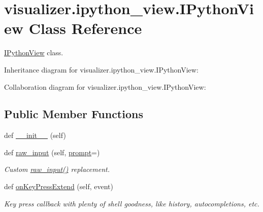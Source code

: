 \hypertarget{classvisualizer_1_1ipython__view_1_1IPythonView}{}\section{visualizer.\+ipython\+\_\+view.\+I\+Python\+View Class Reference}
\label{classvisualizer_1_1ipython__view_1_1IPythonView}


\hyperlink{classvisualizer_1_1ipython__view_1_1IPythonView}{I\+Python\+View} class.  




Inheritance diagram for visualizer.\+ipython\+\_\+view.\+I\+Python\+View\+:


Collaboration diagram for visualizer.\+ipython\+\_\+view.\+I\+Python\+View\+:
\subsection*{Public Member Functions}
\begin{DoxyCompactItemize}
\item 
def \hyperlink{classvisualizer_1_1ipython__view_1_1IPythonView_affe31c9ab99b05c0479701ccac7ec70a}{\+\_\+\+\_\+init\+\_\+\+\_\+} (self)
\item 
def \hyperlink{classvisualizer_1_1ipython__view_1_1IPythonView_a2d725299a1a2ba91356404a914c63f43}{raw\+\_\+input} (self, \hyperlink{classvisualizer_1_1ipython__view_1_1IPythonView_ac70be49befad3abf7fbb1fa8d460e439}{prompt}=\textquotesingle{}\textquotesingle{})
\begin{DoxyCompactList}\small\item\em Custom \hyperlink{classvisualizer_1_1ipython__view_1_1IPythonView_a2d725299a1a2ba91356404a914c63f43}{raw\+\_\+input()} replacement. \end{DoxyCompactList}\item 
def \hyperlink{classvisualizer_1_1ipython__view_1_1IPythonView_a0f261fe53c5813480f2fb71b9236f380}{on\+Key\+Press\+Extend} (self, event)
\begin{DoxyCompactList}\small\item\em Key press callback with plenty of shell goodness, like history, autocompletions, etc. \end{DoxyCompactList}\end{DoxyCompactItemize}
